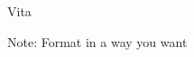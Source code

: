 \clearpage
{}
\begin{centering}
Vita\\
\end{centering}

\noindent  Note: Format in a way you want \\

\lipsum[1]
